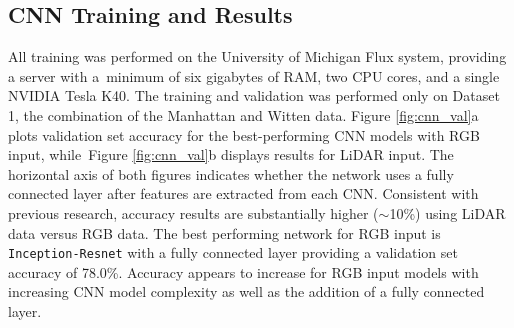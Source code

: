 \subsection{CNN Training and Results}

All training was performed on the University of Michigan Flux system, providing a server with a~minimum of six gigabytes of RAM, two CPU cores, and a single NVIDIA Tesla K40. The training and validation was performed only on Dataset 1, the combination of the Manhattan and Witten data. Figure \ref{fig:cnn_val}a plots validation set accuracy for the best-performing \ac{CNN} models with RGB input, while~Figure \ref{fig:cnn_val}b displays results for LiDAR input.  The horizontal axis of both figures indicates whether the network uses a fully connected layer after features are extracted from each \ac{CNN}.  Consistent with previous research, accuracy results are substantially higher ($\sim$10\%) using LiDAR data versus RGB data. The best performing network for RGB input is \texttt{Inception-Resnet} with a fully connected layer providing a validation set accuracy of 78.0\%.  Accuracy appears to increase for RGB input models with increasing \ac{CNN} model complexity as well as the addition of a fully connected layer.  

